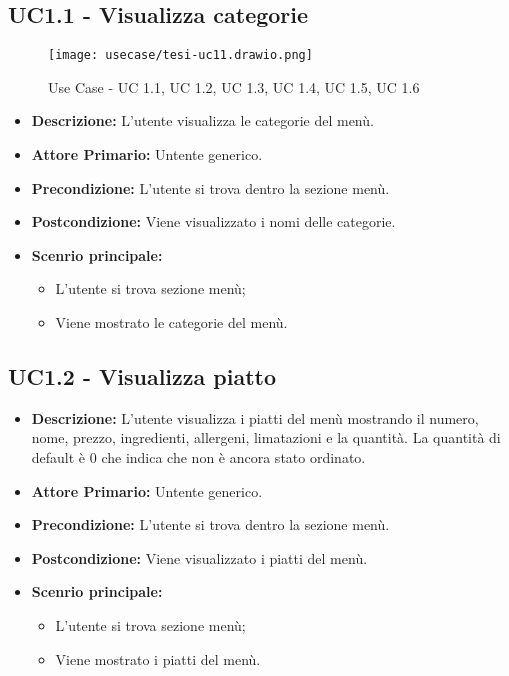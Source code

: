 \subsection{UC1.1 - Visualizza categorie}
\begin{figure}[H]
    \centering
    \texttt{[image: usecase/tesi-uc11.drawio.png]}
    \caption{Use Case - UC 1.1, UC 1.2, UC 1.3, UC 1.4, UC 1.5, UC 1.6}
\end{figure}
\begin{itemize}
    \item \textbf{Descrizione:} L'utente visualizza le categorie del menù.
    \item \textbf{Attore Primario:} Untente generico.
    \item \textbf{Precondizione:} L'utente si trova dentro la sezione menù.
    \item \textbf{Postcondizione:} Viene visualizzato i nomi delle categorie.
    \item \textbf{Scenrio principale:}
    \begin{itemize}
        \item L'utente si trova sezione menù;
        \item Viene mostrato le categorie del menù.
    \end{itemize}
\end{itemize}
\subsection{UC1.2 - Visualizza piatto}
\begin{itemize}
    \item \textbf{Descrizione:} L'utente visualizza i piatti del menù mostrando il numero, nome, prezzo, ingredienti, allergeni, limatazioni e la quantità. La quantità di default è 0 che indica che non è ancora stato ordinato.
    \item \textbf{Attore Primario:} Untente generico.
    \item \textbf{Precondizione:} L'utente si trova dentro la sezione menù.
    \item \textbf{Postcondizione:} Viene visualizzato i piatti del menù.
    \item \textbf{Scenrio principale:}  
    \begin{itemize}
        \item L'utente si trova sezione menù;
        \item Viene mostrato i piatti del menù.
    \end{itemize}
\end{itemize}
